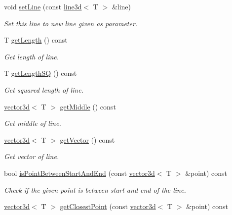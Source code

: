 \begin{DoxyCompactItemize}
void \hyperlink{classirr_1_1core_1_1line3d_a75d2a9f34ca66c2a1399f8b9fe0fa760}{set\+Line} (const \hyperlink{classirr_1_1core_1_1line3d}{line3d}$<$ T $>$ \&line)
\begin{DoxyCompactList}\small\item\em Set this line to new line given as parameter. \end{DoxyCompactList}\item 
T \hyperlink{classirr_1_1core_1_1line3d_aa6bf257a8b227c4f5d974ee76607a700}{get\+Length} () const
\begin{DoxyCompactList}\small\item\em Get length of line. \end{DoxyCompactList}\item 
T \hyperlink{classirr_1_1core_1_1line3d_a4754398992c5922efe33cad0bf773ddc}{get\+Length\+SQ} () const
\begin{DoxyCompactList}\small\item\em Get squared length of line. \end{DoxyCompactList}\item 
\hyperlink{classirr_1_1core_1_1vector3d}{vector3d}$<$ T $>$ \hyperlink{classirr_1_1core_1_1line3d_a14d8d80862836da4ecf51db9dcab95ee}{get\+Middle} () const
\begin{DoxyCompactList}\small\item\em Get middle of line. \end{DoxyCompactList}\item 
\hyperlink{classirr_1_1core_1_1vector3d}{vector3d}$<$ T $>$ \hyperlink{classirr_1_1core_1_1line3d_a8df2350580b6be884b6f6d48c8932795}{get\+Vector} () const
\begin{DoxyCompactList}\small\item\em Get vector of line. \end{DoxyCompactList}\item 
bool \hyperlink{classirr_1_1core_1_1line3d_abe1e874f2058e965bc52802c41672fbc}{is\+Point\+Between\+Start\+And\+End} (const \hyperlink{classirr_1_1core_1_1vector3d}{vector3d}$<$ T $>$ \&point) const
\begin{DoxyCompactList}\small\item\em Check if the given point is between start and end of the line. \end{DoxyCompactList}\item 
\hyperlink{classirr_1_1core_1_1vector3d}{vector3d}$<$ T $>$ \hyperlink{classirr_1_1core_1_1line3d_a40fefd94d9fe0d206eb46e6db52826dc}{get\+Closest\+Point} (const \hyperlink{classirr_1_1core_1_1vector3d}{vector3d}$<$ T $>$ \&point) const

\end{DoxyCompactItemize}
